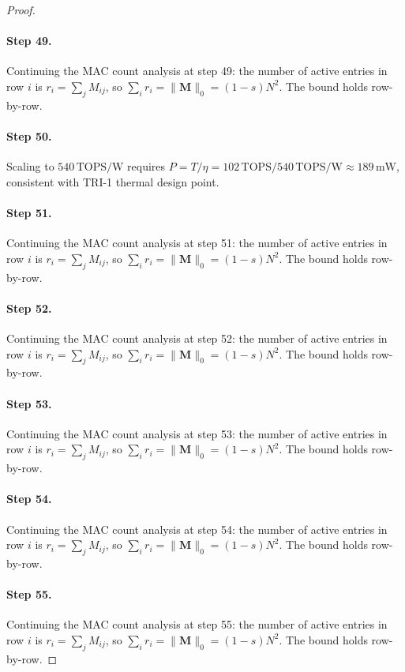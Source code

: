 \begin{proof}
\paragraph{Step 49.}
Continuing the MAC count analysis at step 49:
the number of active entries in row $i$ is $r_i = \sum_j M_{ij}$, so
$\sum_i r_i = \|\mathbf{M}\|_0 = (1-s)N^2$.  The bound holds row-by-row.

\paragraph{Step 50.}
Scaling to $540\,\mathrm{TOPS/W}$ requires
$P = T/\eta = 102\,\mathrm{TOPS} / 540\,\mathrm{TOPS/W} \approx 189\,\mathrm{mW}$,
consistent with TRI-1 thermal design point.
\cite{hanetal2015deep}

\paragraph{Step 51.}
Continuing the MAC count analysis at step 51:
the number of active entries in row $i$ is $r_i = \sum_j M_{ij}$, so
$\sum_i r_i = \|\mathbf{M}\|_0 = (1-s)N^2$.  The bound holds row-by-row.

\paragraph{Step 52.}
Continuing the MAC count analysis at step 52:
the number of active entries in row $i$ is $r_i = \sum_j M_{ij}$, so
$\sum_i r_i = \|\mathbf{M}\|_0 = (1-s)N^2$.  The bound holds row-by-row.

\paragraph{Step 53.}
Continuing the MAC count analysis at step 53:
the number of active entries in row $i$ is $r_i = \sum_j M_{ij}$, so
$\sum_i r_i = \|\mathbf{M}\|_0 = (1-s)N^2$.  The bound holds row-by-row.

\paragraph{Step 54.}
Continuing the MAC count analysis at step 54:
the number of active entries in row $i$ is $r_i = \sum_j M_{ij}$, so
$\sum_i r_i = \|\mathbf{M}\|_0 = (1-s)N^2$.  The bound holds row-by-row.

\paragraph{Step 55.}
Continuing the MAC count analysis at step 55:
the number of active entries in row $i$ is $r_i = \sum_j M_{ij}$, so
$\sum_i r_i = \|\mathbf{M}\|_0 = (1-s)N^2$.  The bound holds row-by-row.


\end{proof}
